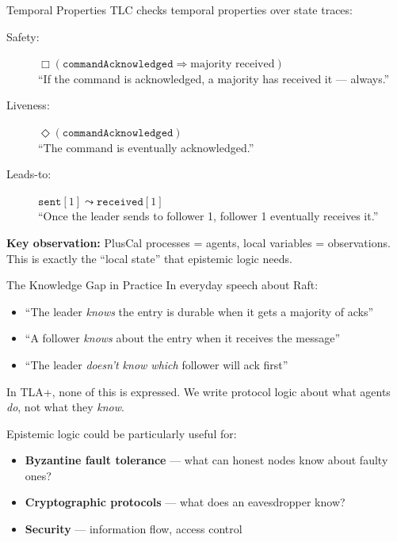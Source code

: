 \documentclass[aspectratio=169,12pt]{beamer}
\begin{document}
\begin{frame}{Temporal Properties}
TLC checks temporal properties over state traces:

\vspace{0.3em}
\begin{description}
\item[Safety:] $\Box(\texttt{commandAcknowledged} \Rightarrow \text{majority received})$\\
{\small ``If the command is acknowledged, a majority has received it --- always.''}
\vspace{0.2em}
\item[Liveness:] $\Diamond(\texttt{commandAcknowledged})$\\
{\small ``The command is eventually acknowledged.''}
\vspace{0.2em}
\item[Leads-to:] $\texttt{sent}[1] \leadsto \texttt{received}[1]$\\
{\small ``Once the leader sends to follower 1, follower 1 eventually receives it.''}
\end{description}

\vspace{0.5em}
\textbf{Key observation:} PlusCal processes = agents, local variables = observations.
This is exactly the ``local state'' that epistemic logic needs.
\end{frame}


\begin{frame}{The Knowledge Gap in Practice}
In everyday speech about Raft:
\begin{itemize}
\item ``The leader \emph{knows} the entry is durable when it gets a majority of acks''
\item ``A follower \emph{knows} about the entry when it receives the message''
\item ``The leader \emph{doesn't know which} follower will ack first''
\end{itemize}

\vspace{0.3em}
In TLA+, none of this is expressed. We write protocol logic about what agents \emph{do}, not what they \emph{know}.

\vspace{0.3em}
Epistemic logic could be particularly useful for:
\begin{itemize}
\item \textbf{Byzantine fault tolerance} --- what can honest nodes know about faulty ones?
\item \textbf{Cryptographic protocols} --- what does an eavesdropper know?
\item \textbf{Security} --- information flow, access control
\end{itemize}
\end{frame}
\end{document}
